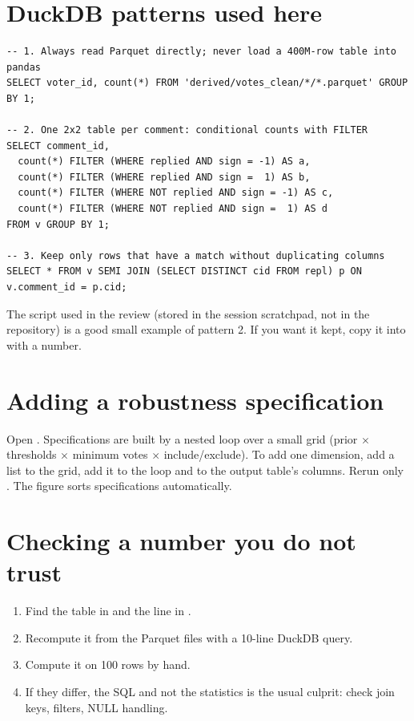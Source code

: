\section{DuckDB patterns used here}
\begin{lstlisting}
-- 1. Always read Parquet directly; never load a 400M-row table into pandas
SELECT voter_id, count(*) FROM 'derived/votes_clean/*/*.parquet' GROUP BY 1;

-- 2. One 2x2 table per comment: conditional counts with FILTER
SELECT comment_id,
  count(*) FILTER (WHERE replied AND sign = -1) AS a,
  count(*) FILTER (WHERE replied AND sign =  1) AS b,
  count(*) FILTER (WHERE NOT replied AND sign = -1) AS c,
  count(*) FILTER (WHERE NOT replied AND sign =  1) AS d
FROM v GROUP BY 1;

-- 3. Keep only rows that have a match without duplicating columns
SELECT * FROM v SEMI JOIN (SELECT DISTINCT cid FROM repl) p ON v.comment_id = p.cid;
\end{lstlisting}
The script  used in the review (stored in the session scratchpad, not in the repository) is a good small example of pattern 2. If you want it kept, copy it into  with a number.

\section{Adding a robustness specification}
Open . Specifications are built by a nested loop over a small grid (prior $\times$ thresholds $\times$ minimum votes $\times$ include/exclude). To add one dimension, add a list to the grid, add it to the loop and to the output table's columns. Rerun only . The figure sorts specifications automatically.

\section{Checking a number you do not trust}
\begin{enumerate}
  \item Find the table in  and the line in .
  \item Recompute it from the Parquet files with a 10-line DuckDB query.
  \item Compute it on 100 rows by hand.
  \item If they differ, the SQL and not the statistics is the usual culprit: check join keys, filters, NULL handling.
\end{enumerate}

